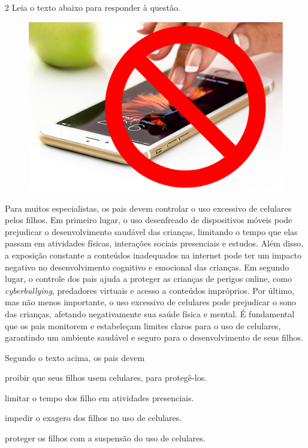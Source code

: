 \num{2} Leia o texto abaixo para responder à questão. 

\begin{myquote}

\begin{figure}[H]
\centering
\includegraphics[scale=0.25]{./imgSAEB_7_POR/media/image39.png}
\end{figure} 

Para muitos especialistas, os pais devem controlar o uso excessivo de celulares 
pelos filhos. Em primeiro lugar, o uso desenfreado de dispositivos
móveis pode prejudicar o desenvolvimento saudável das crianças, limitando o
tempo que elas passam em atividades físicas, interações sociais presenciais e
estudos. Além disso, a exposição constante a conteúdos inadequados na internet
pode ter um impacto negativo no desenvolvimento cognitivo e emocional das
crianças. Em segundo lugar, o controle dos pais ajuda a proteger as crianças
de perigos online, como \textit{cyberbullying}, predadores virtuais e acesso a
conteúdos impróprios. Por último, mas não menos importante, o uso excessivo de
celulares pode prejudicar o sono das crianças, afetando negativamente sua
saúde física e mental. É fundamental que os pais monitorem e
estabeleçam limites claros para o uso de celulares, garantindo um ambiente
saudável e seguro para o desenvolvimento de seus filhos.


\end{myquote}

Segundo o texto acima, os pais devem   

\begin{escolha}

  \item proibir que seus filhos usem celulares, para protegê-los.
  
  \item limitar o tempo dos filho em atividades presenciais.
  
  \item impedir o exagero dos filhos no uso de celulares.
  
  \item proteger os filhos com a suspensão do uso de celulares.

\end{escolha}

